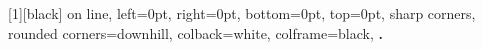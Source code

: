 {%
    \newtcbox{\xmybox}[1][black]{
        on line,
        left=0pt,
        right=0pt,
        bottom=0pt,
        top=0pt,
        sharp corners,
        rounded corners=downhill,
        colback=white,
        colframe=black,
        }
    \medbreak
    {\bfseries\XSIMmixedcase{\GetExerciseName}\nobreakspace{}.}%
    }%
{\par}
